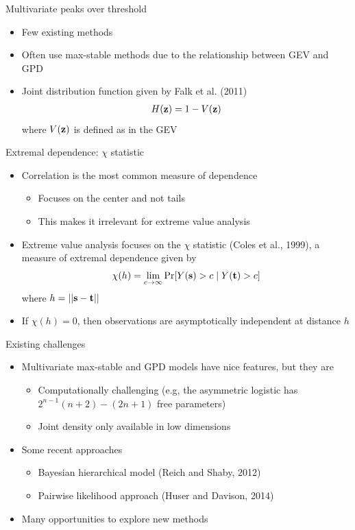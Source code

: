 \documentclass{beamer}
\begin{document}
\begin{frame}{Multivariate peaks over threshold}
  \begin{itemize} \setlength{\itemsep}{1em}
    \item Few existing methods
    \item Often use max-stable methods due to the relationship between GEV and GPD
    \item Joint distribution function given by Falk et al. (2011)
    \begin{align*}
      H(\mbox{\bf z}) = 1 - V(\mbox{\bf z})
    \end{align*}
    where $V(\mbox{\bf z})$ is defined as in the GEV
  \end{itemize}
\end{frame}

\begin{frame}{Extremal dependence: $\chi$ statistic}
  \begin{itemize} \setlength{\itemsep}{1em}
    \item Correlation is the most common measure of dependence
    \begin{itemize}
      \item Focuses on the center and not tails
      \item This makes it irrelevant for extreme value analysis
    \end{itemize}
    \item Extreme value analysis focuses on the $\chi$ statistic (Coles et al., 1999), a measure of extremal dependence given by
    \begin{align*}
      \chi(h) = \lim_{c \rightarrow \infty}\Pr[Y(\mbox{\bf s}) > c \mid Y(\mbox{\bf t}) > c]
    \end{align*}
    where $h = ||\mbox{\bf s} - \mbox{\bf t}||$
    \item If $ \chi(h) = 0$, then observations are asymptotically independent at distance $h$
  \end{itemize}
\end{frame}

\begin{frame}{Existing challenges}
  \begin{itemize} \setlength{\itemsep}{1em}
    \item Multivariate max-stable and GPD models have nice features, but they are
    \begin{itemize}
      \item Computationally challenging (e.g,  the asymmetric logistic has $2^{n-1}(n + 2) - (2n + 1)$ free parameters)
      \item Joint density only available in low dimensions
    \end{itemize}
    \item Some recent approaches
    \begin{itemize}
      \item Bayesian hierarchical model (Reich and Shaby, 2012)
      \item Pairwise likelihood approach (Huser and Davison, 2014)
    \end{itemize}
    \item Many opportunities to explore new methods
  \end{itemize}
\end{frame}
\end{document}
